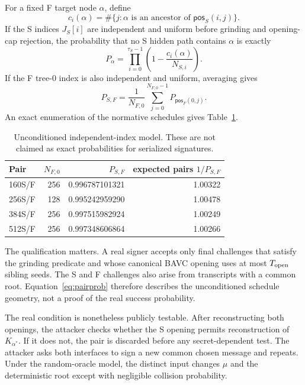 \documentclass[11pt,a4paper]{article}
\newcommand{\pos}{\mathsf{pos}}
\begin{document}
For a fixed F target node $\alpha$, define
\[
 c_i(\alpha)=\#\{j:\alpha\text{ is an ancestor of }\pos_S(i,j)\}.
\]
If the S indices $J_S[i]$ are independent and uniform before grinding and
opening-cap rejection, the probability that no S hidden path contains $\alpha$
is exactly
\begin{equation}
 P_\alpha=\prod_{i=0}^{\tau_S-1}
                 \left(1-\frac{c_i(\alpha)}{N_{S,i}}\right). \label{eq:palpha}
\end{equation}
If the F tree-0 index is also independent and uniform, averaging gives
\begin{equation}
 P_{S,F}=\frac1{N_{F,0}}
   \sum_{j=0}^{N_{F,0}-1}P_{\pos_F(0,j)}.              \label{eq:pairprob}
\end{equation}
An exact enumeration of the normative schedules gives Table~\ref{tab:prob}.

\begin{table}[ht]
\centering
\caption{Unconditioned independent-index model.  These are not claimed as exact
probabilities for serialized signatures.}
\label{tab:prob}
\begin{tabular}{lrrr}
\toprule
Pair & $N_{F,0}$ & $P_{S,F}$ & expected pairs $1/P_{S,F}$\\
\midrule
160S/F & 256 & 0.996787101321 & 1.00322\\
256S/F & 128 & 0.995242959290 & 1.00478\\
384S/F & 256 & 0.997515982924 & 1.00249\\
512S/F & 256 & 0.997348606864 & 1.00266\\
\bottomrule
\end{tabular}
\end{table}

The qualification matters.  A real signer accepts only final challenges that
satisfy the grinding predicate and whose canonical BAVC opening uses at most
$T_{\rm open}$ sibling seeds.  The S and F challenges also arise from transcripts
with a common root.  Equation~\eqref{eq:pairprob} therefore describes the
unconditioned schedule geometry, not a proof of the real success probability.

The real condition is nonetheless publicly testable.  After reconstructing both
openings, the attacker checks whether the S opening permits reconstruction of
$K_{\alpha^*}$.  If it does not, the pair is discarded before any secret-dependent
test.  The attacker asks
both interfaces to sign a new common chosen message and repeats.  Under the
random-oracle model, the distinct input changes $\mu$ and the deterministic root
except with negligible collision probability.
\end{document}
